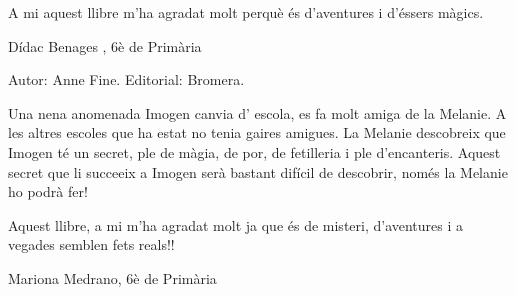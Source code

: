 \begin{shortnews}
{A mi aquest llibre m’ha agradat molt perquè és d’aventures i d’éssers màgics.

Dídac Benages , 6è de Primària
}

{
Autor: Anne Fine. Editorial: Bromera.

Una nena anomenada Imogen canvia d’ escola, es fa  molt amiga de la Melanie. A les altres escoles que ha estat no tenia gaires amigues. La Melanie descobreix que Imogen té un secret, ple de màgia, de por, de fetilleria i ple d’encanteris. Aquest secret que li succeeix a Imogen serà bastant difícil de descobrir, només la Melanie ho podrà fer!

Aquest llibre, a mi m’ha agradat molt ja que és de misteri, d’aventures i a vegades semblen fets reals!!

Mariona Medrano, 6è de Primària
}

\end{shortnews}
